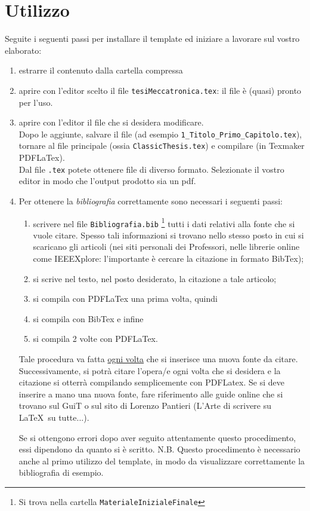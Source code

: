 \documentclass[paper=a4, fontsize=11pt]{scrartcl}	%
\numberwithin{equation}{section}		%
\numberwithin{figure}{section}			%
\numberwithin{table}{section}				%
\begin{document}
\section{Utilizzo} 
Seguite i seguenti passi per installare il template ed iniziare a lavorare sul vostro elaborato:
\begin{enumerate}
\item estrarre il contenuto dalla cartella compressa 
\item aprire con l'editor scelto il file \texttt{tesiMeccatronica.tex}: il file \`e (quasi) pronto per l'uso.
\item aprire con l'editor il file che si desidera modificare.\\
Dopo le aggiunte, salvare il file (ad esempio \texttt{1\_Titolo\_Primo\_Capitolo.tex}), tornare al file principale (ossia \texttt{ClassicThesis.tex}) e compilare (in Texmaker PDFLaTex).\\
Dal file \texttt{.tex} potete ottenere file di diverso formato. Selezionate il vostro editor in modo che l'output prodotto sia un pdf.
\item Per ottenere la \emph{bibliografia} correttamente sono necessari i seguenti passi:
\begin{enumerate}
\item scrivere nel file \texttt{Bibliografia.bib} \footnote{Si trova nella cartella \texttt{MaterialeInizialeFinale}} tutti i dati relativi alla fonte che si vuole citare. Spesso tali informazioni si trovano nello stesso posto in cui si scaricano gli articoli (nei siti personali dei Professori, nelle librerie online come IEEEXplore: l'importante \`e cercare la citazione in formato BibTex);
\item si scrive nel testo, nel posto desiderato, la citazione a tale articolo; 
\item si compila con PDFLaTex una prima volta, quindi 
\item si compila con BibTex e infine  
\item si compila 2 volte con PDFLaTex.
\end{enumerate}
Tale procedura va fatta \underline{ogni volta} che si inserisce una nuova fonte da citare. 
Successivamente, si potr\`a citare l'opera/e ogni volta che si desidera e la citazione si otterr\`a compilando semplicemente con PDFLatex. 
Se si deve inserire a mano una nuova fonte, fare riferimento alle guide online che si trovano sul GuiT o sul sito di Lorenzo Pantieri (L'Arte di scrivere su \LaTeX~su tutte...).

Se si ottengono errori dopo aver seguito attentamente questo procedimento, essi dipendono da quanto si \`e scritto. 
N.B. Questo procedimento \`e necessario anche al primo utilizzo del template, in modo da visualizzare correttamente la bibliografia di esempio.


\end{enumerate}
\end{document}
